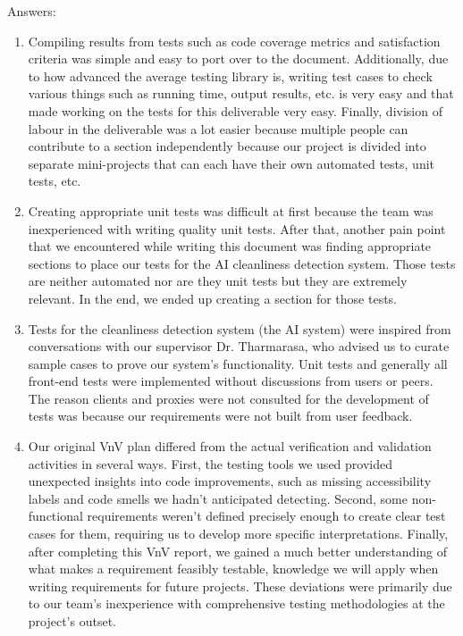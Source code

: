 \documentclass[12pt, titlepage]{article}
\begin{document}
Answers:
\begin{enumerate}
  \item Compiling results from tests such as code coverage metrics and satisfaction criteria was simple and easy to port over to the document. Additionally, due to how advanced the average testing library is, writing test cases to check various things such as running time, output results, etc. is very easy and that made working on the tests for this deliverable very easy. Finally, division of labour in the deliverable was a lot easier because multiple people can contribute to a section independently because our project is divided into separate mini-projects that can each have their own automated tests, unit tests, etc.
  \item Creating appropriate unit tests was difficult at first because the team was inexperienced with writing quality unit tests. After that, another pain point that we encountered while writing this document was finding appropriate sections to place our tests for the AI cleanliness detection system. Those tests are neither automated nor are they unit tests but they are extremely relevant. In the end, we ended up creating a section for those tests.
  \item Tests for the cleanliness detection system (the AI system) were inspired from conversations with our supervisor Dr. Tharmarasa, who advised us to curate sample cases to prove our system's functionality. Unit tests and generally all front-end tests were implemented without discussions from users or peers. The reason clients and proxies were not consulted for the development of tests was because our requirements were not built from user feedback.
  \item Our original VnV plan differed from the actual verification and validation activities in several ways. First, the testing tools we used provided unexpected insights into code improvements, such as missing accessibility labels and code smells we hadn't anticipated detecting. Second, some non-functional requirements weren't defined precisely enough to create clear test cases for them, requiring us to develop more specific interpretations. Finally, after completing this VnV report, we gained a much better understanding of what makes a requirement feasibly testable, knowledge we will apply when writing requirements for future projects. These deviations were primarily due to our team's inexperience with comprehensive testing methodologies at the project's outset.
\end{enumerate}
\end{document}

